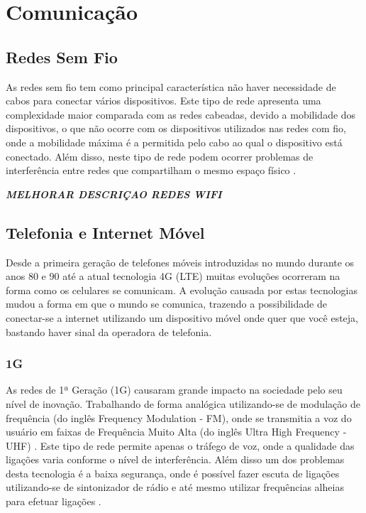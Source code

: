 \section{Comunicação}

\subsection{Redes Sem Fio}
As redes sem fio tem como principal característica não haver necessidade de cabos para conectar vários dispositivos. Este tipo de rede apresenta uma complexidade maior comparada com as redes cabeadas, devido a mobilidade dos dispositivos, o que não ocorre com os dispositivos utilizados nas redes com fio, onde a mobilidade máxima é a permitida pelo cabo ao qual o dispositivo está conectado. Além disso, neste tipo de rede podem ocorrer problemas de interferência entre redes que compartilham o mesmo espaço físico 
\cite{IEEE80211}.

\emph{\bf{MELHORAR DESCRIÇAO REDES WIFI}}

\subsection{Telefonia e Internet Móvel}
Desde a primeira geração de telefones móveis introduzidas no mundo durante os anos 80 e 90  até a atual tecnologia 4G (LTE) muitas evoluções ocorreram na forma como os celulares se comunicam. A evolução causada por estas tecnologias mudou a forma em que o mundo se comunica, trazendo a possibilidade de conectar-se a internet utilizando um dispositivo móvel onde quer que você esteja, bastando haver sinal da operadora de telefonia.

\subsubsection{1G}
As redes de 1ª Geração (1G) causaram grande impacto na sociedade pelo seu nível de inovação. Trabalhando de forma analógica utilizando-se de modulação de frequência (do inglês Frequency Modulation - FM), onde se transmitia a voz do usuário em faixas de Frequência Muito Alta (do inglês Ultra High Frequency - UHF) \cite{AEvolucaoTelefoniaCelular}. Este tipo de rede permite apenas o tráfego de voz, onde a qualidade das ligações varia conforme o nível de interferência. Além disso um dos problemas desta tecnologia é a baixa segurança, onde é possível fazer escuta de ligações utilizando-se de sintonizador de rádio e até mesmo utilizar frequências alheias para efetuar ligações  \cite{GeracoesTelefoniaMovel}.

